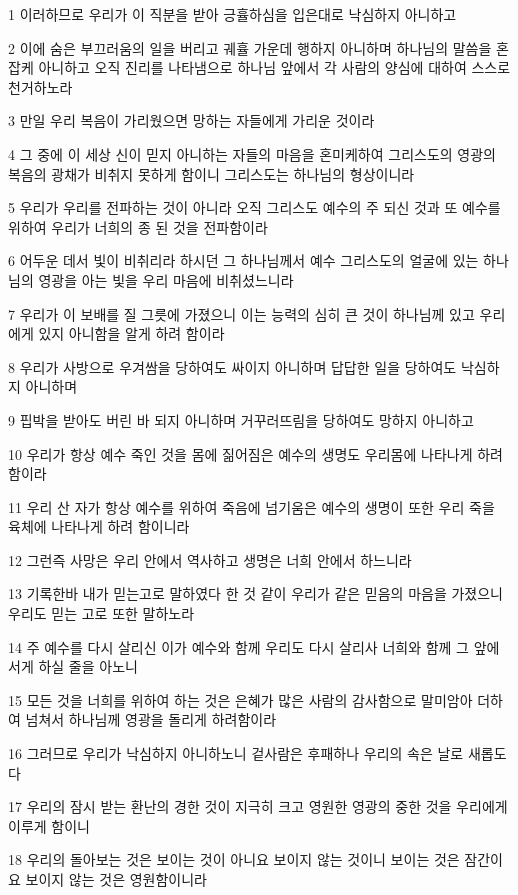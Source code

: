 \par 1 이러하므로 우리가 이 직분을 받아 긍휼하심을 입은대로 낙심하지 아니하고
\par 2 이에 숨은 부끄러움의 일을 버리고 궤휼 가운데 행하지 아니하며 하나님의 말씀을 혼잡케 아니하고 오직 진리를 나타냄으로 하나님 앞에서 각 사람의 양심에 대하여 스스로 천거하노라
\par 3 만일 우리 복음이 가리웠으면 망하는 자들에게 가리운 것이라
\par 4 그 중에 이 세상 신이 믿지 아니하는 자들의 마음을 혼미케하여 그리스도의 영광의 복음의 광채가 비취지 못하게 함이니 그리스도는 하나님의 형상이니라
\par 5 우리가 우리를 전파하는 것이 아니라 오직 그리스도 예수의 주 되신 것과 또 예수를 위하여 우리가 너희의 종 된 것을 전파함이라
\par 6 어두운 데서 빛이 비취리라 하시던 그 하나님께서 예수 그리스도의 얼굴에 있는 하나님의 영광을 아는 빛을 우리 마음에 비취셨느니라
\par 7 우리가 이 보배를 질 그릇에 가졌으니 이는 능력의 심히 큰 것이 하나님께 있고 우리에게 있지 아니함을 알게 하려 함이라
\par 8 우리가 사방으로 우겨쌈을 당하여도 싸이지 아니하며 답답한 일을 당하여도 낙심하지 아니하며
\par 9 핍박을 받아도 버린 바 되지 아니하며 거꾸러뜨림을 당하여도 망하지 아니하고
\par 10 우리가 항상 예수 죽인 것을 몸에 짊어짐은 예수의 생명도 우리몸에 나타나게 하려 함이라
\par 11 우리 산 자가 항상 예수를 위하여 죽음에 넘기움은 예수의 생명이 또한 우리 죽을 육체에 나타나게 하려 함이니라
\par 12 그런즉 사망은 우리 안에서 역사하고 생명은 너희 안에서 하느니라
\par 13 기록한바 내가 믿는고로 말하였다 한 것 같이 우리가 같은 믿음의 마음을 가졌으니 우리도 믿는 고로 또한 말하노라
\par 14 주 예수를 다시 살리신 이가 예수와 함께 우리도 다시 살리사 너희와 함께 그 앞에 서게 하실 줄을 아노니
\par 15 모든 것을 너희를 위하여 하는 것은 은혜가 많은 사람의 감사함으로 말미암아 더하여 넘쳐서 하나님께 영광을 돌리게 하려함이라
\par 16 그러므로 우리가 낙심하지 아니하노니 겉사람은 후패하나 우리의 속은 날로 새롭도다
\par 17 우리의 잠시 받는 환난의 경한 것이 지극히 크고 영원한 영광의 중한 것을 우리에게 이루게 함이니
\par 18 우리의 돌아보는 것은 보이는 것이 아니요 보이지 않는 것이니 보이는 것은 잠간이요 보이지 않는 것은 영원함이니라

